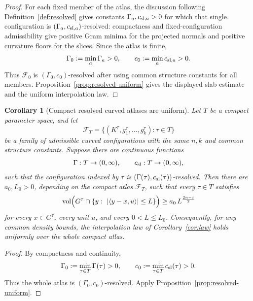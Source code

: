 \documentclass[11pt]{article}
\newtheorem{corollary}[theorem]{Corollary}
\newcommand{\vol}{\operatorname{vol}}
\begin{document}
\begin{proof}
For each fixed member of the atlas, the discussion following
Definition~\ref{def:resolved} gives constants
\(\Gamma_a,c_{{\rm sl},a}>0\) for which that single configuration is
\((\Gamma_a,c_{{\rm sl},a})\)-resolved: compactness and fixed-configuration
admissibility give positive Gram minima for the projected normals and positive
curvature floors for the slices.  Since the atlas is finite,
\[
  \Gamma_0:=\min_a\Gamma_a>0,\qquad
  c_0:=\min_a c_{{\rm sl},a}>0 .
\]
Thus \(\mathcal F_0\) is \((\Gamma_0,c_0)\)-resolved after using common
structure constants for all members.  Proposition~\ref{prop:resolved-uniform}
gives the displayed slab estimate and the uniform interpolation law.
\end{proof}

\begin{corollary}[Compact resolved curved atlases are uniform]
\label{cor:compact-atlas}
Let \(T\) be a compact parameter space, and let
\[
  \mathcal F_T=\{(K^\tau,g^\tau_1,\ldots,g^\tau_k):\tau\in T\}
\]
be a family of admissible curved configurations with the same \(n,k\) and
common structure constants.  Suppose there are continuous functions
\[
  \Gamma:T\to(0,\infty),\qquad c_{\rm sl}:T\to(0,\infty),
\]
such that the configuration indexed by \(\tau\) is
\((\Gamma(\tau),c_{\rm sl}(\tau))\)-resolved.  Then there are \(a_0,L_0>0\),
depending on the compact atlas \(\mathcal F_T\), such that every
\(\tau\in T\) satisfies
\[
\vol\Bigl(G^\tau\cap\{y:\ |\langle y-x,u\rangle|\le L\}\Bigr)
\ge a_0\,L^{\frac{2n-j}2}
\]
for every \(x\in G^\tau\), every unit \(u\), and every \(0<L\le L_0\).
Consequently, for any common density bounds, the interpolation law of
Corollary~\ref{cor:law} holds uniformly over the whole compact atlas.
\end{corollary}

\begin{proof}
By compactness and continuity,
\[
  \Gamma_0:=\min_{\tau\in T}\Gamma(\tau)>0,\qquad
  c_0:=\min_{\tau\in T}c_{\rm sl}(\tau)>0 .
\]
Thus the whole atlas is \((\Gamma_0,c_0)\)-resolved.  Apply
Proposition~\ref{prop:resolved-uniform}.
\end{proof}
\end{document}
